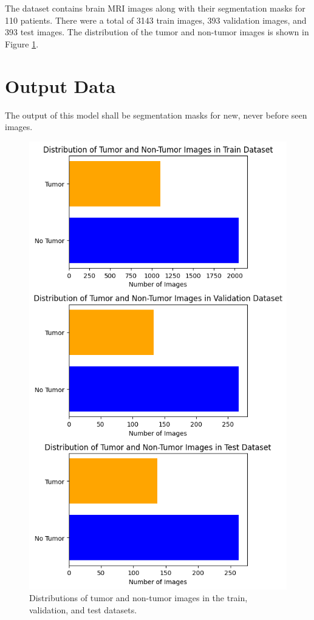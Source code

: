 \documentclass[conference]{IEEEtran}
\begin{document}
The dataset contains brain MRI images along with their segmentation masks for 110 patients. There were a total of 3143 train images, 393 validation images, and 393 test images. The distribution of the tumor and non-tumor images is shown in Figure \ref{fig:datastats}.


\section{Output Data}\label{sec3}
The output of this model shall be segmentation masks for new, never before seen images.
\begin{figure}[!t]
    \centering
    \includegraphics[width=\columnwidth]{imgs/data_stats.png}
    \caption{Distributions of tumor and non-tumor images in the train, validation, and test datasets.}
    \label{fig:datastats}
\end{figure}
\end{document}
